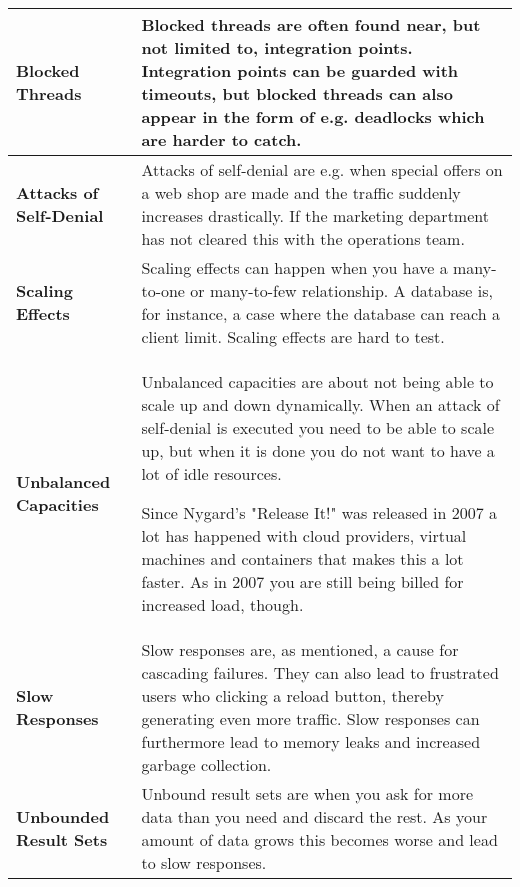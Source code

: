 \begin{longtable}{|p{4cm}|p{10.5cm}|}
\textbf{Blocked Threads}        & 
Blocked threads are often found near, but not limited to, integration points. Integration points can be guarded with timeouts, but blocked threads can also appear in the form of e.g. deadlocks which are harder to catch.
\\ \hline
\textbf{Attacks of Self-Denial} & 
Attacks of self-denial are e.g. when special offers on a web shop are made and the traffic suddenly increases drastically. If the marketing department has not cleared this with the operations team.
\\ \hline
\textbf{Scaling Effects}        & 
Scaling effects can happen when you have a many-to-one or many-to-few relationship. A database is, for instance, a case where the database can reach a client limit. Scaling effects are hard to test.                                                                                                                                                                                                                                                                                                             \\ \hline
\textbf{Unbalanced Capacities}  & 
Unbalanced capacities are about not being able to scale up and down dynamically. When an attack of self-denial is executed you need to be able to scale up, but when it is done you do not want to have a lot of idle resources.

\noindent Since Nygard's "Release It!" was released in 2007 a lot has happened with cloud providers, virtual machines and containers that makes this a lot faster. As in 2007 you are still being billed for increased load, though.
\\ \hline
\textbf{Slow Responses}         & 
Slow responses are, as mentioned, a cause for cascading failures. They can also lead to frustrated users who clicking a reload button, thereby generating even more traffic. Slow responses can furthermore lead to memory leaks and increased garbage collection.
\\ \hline
\textbf{Unbounded Result Sets}  & 
Unbound result sets are when you ask for more data than you need and discard the rest. As your amount of data grows this becomes worse and lead to slow responses. 
\end{longtable}

